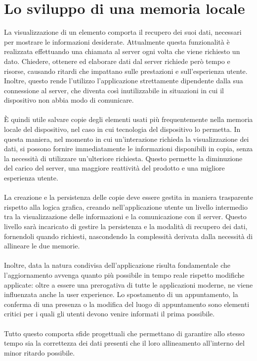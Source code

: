 
\section{Lo sviluppo di una memoria locale}

La visualizzazione di un elemento comporta il recupero dei suoi dati, 
necessari per mostrare le informazioni desiderate.
Attualmente questa funzionalità è realizzata effettuando una chiamata al server
ogni volta che viene richiesto un dato.
Chiedere, ottenere ed elaborare dati dal server richiede però tempo e risorse,
causando ritardi che impattano sulle prestazioni e sull'esperienza utente.
Inoltre, questo rende l'utilizzo l'applicazione strettamente dipendente dalla sua connessione al server,
che diventa così inutilizzabile in situazioni in cui il dispositivo non abbia modo di comunicare.\\
\\
È quindi utile salvare copie degli elementi usati più frequentemente 
nella memoria locale del dispositivo,
nel caso in cui tecnologia del dispositivo lo permetta.
In questa maniera, nel momento in cui un'interazione richieda la visualizzazione dei dati, 
si possono fornire immediatamente le informazioni disponibili in copia, 
senza la necessità di utilizzare un'ulteriore richiesta.
Questo permette la diminuzione del carico del server, 
una maggiore reattività del prodotto e una migliore esperienza utente.\\
\\
La creazione e la persistenza delle copie deve essere gestita 
in maniera trasparente rispetto alla logica grafica, 
creando nell'applicazione utente un livello intermedio tra 
la visualizzazione delle informazioni e la comunicazione con il server.
Questo livello sarà incaricato di gestire la persistenza e la modalità di recupero dei dati,
fornendoli quando richiesti, 
nascondendo la complessità derivata dalla necessità di allineare le due memorie.\\
\\
Inoltre, data la natura condivisa dell'applicazione risulta fondamentale 
che l'aggiornamento avvenga quanto più possibile in tempo reale rispetto modifiche applicate:
oltre a essere una prerogativa di tutte le applicazioni moderne, 
ne viene influenzata anche la user experience. 
Lo spostamento di un appuntamento, 
la conferma di una presenza o la modifica del luogo di appuntamento 
sono elementi critici per i quali gli utenti devono venire informati il prima possibile. \\
\\
Tutto questo comporta sfide progettuali che permettano di garantire allo stesso tempo 
sia la correttezza dei dati presenti che il loro allineamento all'interno del minor ritardo possibile.
\clearpage
